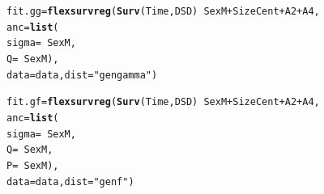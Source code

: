 \documentclass{article}\usepackage[]{graphicx}\usepackage[]{color}
\makeatletter
\newcommand{\hlstr}[1]{\textcolor[rgb]{0.192,0.494,0.8}{#1}}%
\newcommand{\hlopt}[1]{\textcolor[rgb]{0,0,0}{#1}}%
\newcommand{\hlstd}[1]{\textcolor[rgb]{0.345,0.345,0.345}{#1}}%
\newcommand{\hlkwb}[1]{\textcolor[rgb]{0.69,0.353,0.396}{#1}}%
\newcommand{\hlkwc}[1]{\textcolor[rgb]{0.333,0.667,0.333}{#1}}%
\newcommand{\hlkwd}[1]{\textcolor[rgb]{0.737,0.353,0.396}{\textbf{#1}}}%
\newenvironment{kframe}{%
 \def\at@end@of@kframe{}%
 \ifinner\ifhmode%
  \def\at@end@of@kframe{\end{minipage}}%
  \begin{minipage}{\columnwidth}%
 \fi\fi%
 \def\FrameCommand##1{\hskip\@totalleftmargin \hskip-\fboxsep
 \colorbox{shadecolor}{##1}\hskip-\fboxsep
     \hskip-\linewidth \hskip-\@totalleftmargin \hskip\columnwidth}%
 \MakeFramed {\advance\hsize-\width
   \@totalleftmargin\z@ \linewidth\hsize
   \@setminipage}}%
 {\par\unskip\endMakeFramed%
 \at@end@of@kframe}
\newenvironment{knitrout}{}{} %
\makeatother
\begin{document}
\begin{knitrout}
\color{fgcolor}\begin{kframe}
\begin{alltt}
\hlstd{fit.gg} \hlkwb{=} \hlkwd{flexsurvreg}\hlstd{(}\hlkwd{Surv}\hlstd{(Time, DSD)} \hlopt{~} \hlstd{SexM} \hlopt{+} \hlstd{SizeCent} \hlopt{+} \hlstd{A2} \hlopt{+} \hlstd{A4,}
        \hlkwc{anc} \hlstd{=} \hlkwd{list}\hlstd{(}
                \hlkwc{sigma} \hlstd{=} \hlopt{~} \hlstd{SexM,}
                \hlkwc{Q} \hlstd{=} \hlopt{~} \hlstd{SexM),}
        \hlkwc{data} \hlstd{= data,} \hlkwc{dist} \hlstd{=} \hlstr{"gengamma"}\hlstd{)}

\hlstd{fit.gf} \hlkwb{=} \hlkwd{flexsurvreg}\hlstd{(}\hlkwd{Surv}\hlstd{(Time, DSD)} \hlopt{~} \hlstd{SexM} \hlopt{+} \hlstd{SizeCent} \hlopt{+} \hlstd{A2} \hlopt{+} \hlstd{A4,}
        \hlkwc{anc} \hlstd{=} \hlkwd{list}\hlstd{(}
                \hlkwc{sigma} \hlstd{=} \hlopt{~} \hlstd{SexM,}
                \hlkwc{Q} \hlstd{=} \hlopt{~} \hlstd{SexM,}
                \hlkwc{P} \hlstd{=} \hlopt{~} \hlstd{SexM),}
        \hlkwc{data} \hlstd{= data,} \hlkwc{dist} \hlstd{=} \hlstr{"genf"}\hlstd{)}


\end{alltt}
\end{kframe}
\end{knitrout}
\end{document}
